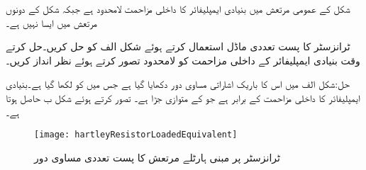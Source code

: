شکل  کے عمومی مرتعش میں بنیادی ایمپلیفائر کا داخلی مزاحمت لامحدود ہے جبکہ شکل  کے دونوں مرتعش میں ایسا نہیں ہے۔

ٹرانزسٹر کا پست تعددی ماڈل استعمال کرتے ہوئے شکل  الف کو حل کریں۔حل کرتے وقت بنیادی ایمپلیفائر کے داخلی مزاحمت کو لامحدود تصور کرتے ہوئے نظر انداز کریں۔

حل:شکل  الف میں اس کا باریک اشاراتی مساوی دور دکھایا گیا ہے جس میں  کو  لکھا گیا ہے۔بنیادی ایمپلیفائر کا داخلی مزاحمت   کے برابر ہے جو  کے متوازی جڑا ہے۔ تصور کرتے ہوئے  شکل  ب حاصل ہوتا ہے۔
\begin{figure}
\centering
\texttt{[image: hartleyResistorLoadedEquivalent]}
\caption{ٹرانزسٹر پر مبنی ہارٹلے مرتعش کا پست تعددی مساوی دور}
\label{شکل_مرتعش_ہارٹلے_مساوی_پست_تعدد_داخلی_مزاحمت_لامحدود}
\end{figure}

